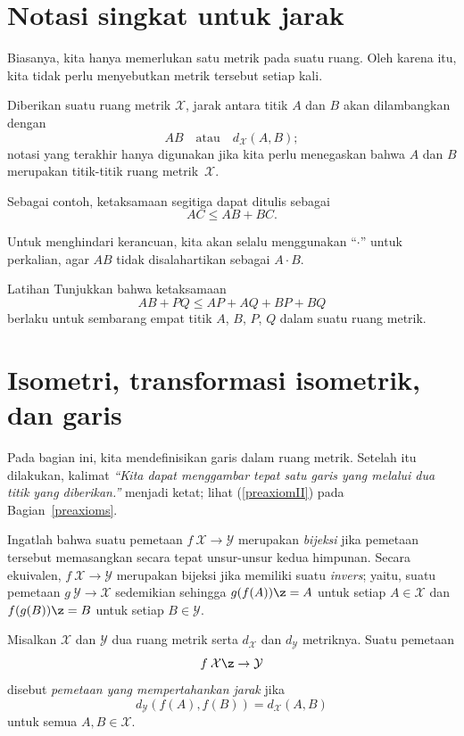 \section{Notasi singkat untuk jarak}

Biasanya, kita hanya memerlukan satu metrik pada suatu ruang.
Oleh karena itu, kita tidak perlu menyebutkan metrik tersebut setiap kali.

Diberikan suatu ruang metrik $\mathcal X$,
jarak antara titik $A$ dan $B$ akan dilambangkan dengan
$$AB
\quad
\text{atau}
\quad
d_{\mathcal X}(A,B);$$
notasi yang terakhir hanya digunakan jika kita perlu menegaskan bahwa $A$ dan $B$ merupakan titik-titik ruang metrik~$\mathcal X$.

Sebagai contoh, ketaksamaan segitiga dapat ditulis sebagai 
$$AC\le AB+BC.$$

Untuk menghindari kerancuan, kita akan selalu menggunakan ``$\cdot$'' untuk perkalian,
agar $AB$ tidak disalahartikan sebagai $A\cdot B$.

\begin{thm}{Latihan}\label{ex:4-triangle}
Tunjukkan bahwa ketaksamaan
\[AB+PQ\le AP+AQ+BP+BQ\]
berlaku untuk sembarang empat titik $A$, $B$, $P$, $Q$ dalam suatu ruang metrik.
\end{thm}


\section{Isometri, transformasi isometrik, dan garis}

Pada bagian ini, kita mendefinisikan garis dalam ruang metrik.
Setelah itu dilakukan, kalimat \textit{``Kita dapat menggambar tepat satu garis yang melalui dua titik yang diberikan.''} menjadi ketat; lihat (\ref{preaxiomII}) pada Bagian~\ref{preaxioms}. 

Ingatlah bahwa suatu pemetaan $f\:\mathcal{X}\to\mathcal{Y}$
merupakan \emph{bijeksi}
jika pemetaan tersebut memasangkan secara tepat unsur-unsur kedua himpunan.
Secara ekuivalen, $f\:\mathcal{X}\to\mathcal{Y}$ merupakan bijeksi jika memiliki suatu \emph{invers};
yaitu, suatu pemetaan $g\:\mathcal{Y}\to\mathcal{X}$
sedemikian sehingga 
$g(f(A))\z=A$ untuk setiap $A\in\mathcal{X}$
dan
$f(g(B))\z=B$ untuk setiap $B\in\mathcal{Y}$. 

Misalkan $\mathcal X$ dan $\mathcal Y$ dua ruang metrik serta $d_{\mathcal X}$ dan $d_{\mathcal Y}$ metriknya. 
Suatu pemetaan 
$$f\:\mathcal X \z\to \mathcal Y$$ 
disebut
\emph{pemetaan yang mempertahankan jarak} jika 
$$d_{\mathcal Y}(f(A), f(B))
 = d_{\mathcal X}(A,B)$$
untuk semua $A,B\in {\mathcal X}$.

